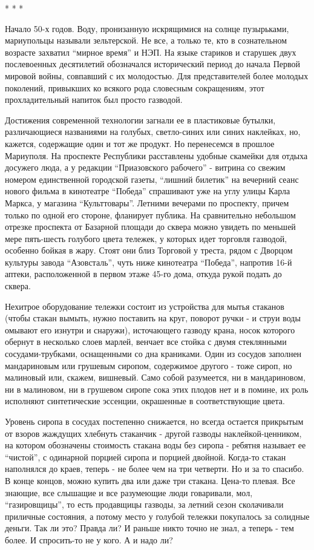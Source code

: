 * * *

Начало 50-х годов. Воду, пронизанную искрящимися на солнце пузырь­ками,
мариупольцы называли зельтерской. Не все, а только те, кто в сознательном
возрасте захватил \enquote{мирное время} и НЭП. На языке стариков и старушек
двух послевоенных десятилетий обозначался исторический период до начала Первой
мировой войны, совпавший с их молодостью. Для пред­ставителей более молодых
поколений, привыкших ко всякого рода словесным сокращениям, этот
прохладительный напиток был просто газводой.

Достижения современной технологии загнали ее в пластиковые бутылки,
различающиеся названиями на голубых, светло-синих или синих наклейках, но,
кажется, содержа­щие один и тот же продукт. Но перенесемся в прошлое
Мариуполя. На проспекте Республики расставлены удобные скамейки для отдыха
досужего люда, а у редакции \enquote{Приазовского рабочего} - витрина со свежим номером
единственной городской газеты, \enquote{лишний билетик} на вечерний сеанс нового
фильма в кинотеатре ­\enquote{Победа} спрашивают уже на углу улицы Карла Маркса, у
магази­на \enquote{Культтовары}. Летними вечерами по проспекту, причем только по одной
его стороне, фланирует публика.  На сравнительно небольшом отрезке проспекта от
Базар­ной площади до сквера можно увидеть по меньшей мере пять-шесть голубого
цвета тележек, у которых идет торговля газводой, особенно бойкая в жару. Стоят
они близ Торговой у треста, рядом с Дворцом культуры завода \enquote{Азовсталь}, чуть
ниже кинотеатра \enquote{Победа}, напротив 16-й аптеки, расположенной в первом этаже
45-го дома, откуда рукой подать до сквера.

Нехитрое оборудование тележки состоит из устройства для мытья стаканов (чтобы
стакан вымыть, нужно поставить на круг, поворот ручки - и струи воды омывают
его изнутри и снаружи), источающего газводу крана, носок которого обернут в
несколько слоев марлей, венчает все стойка с двумя стеклянными
сосудами-трубками, оснащенными со дна краниками. Один из сосудов заполнен
мандариновым или грушевым сиропом, содержимое другого - тоже сироп, но
малиновый или, скажем, вишневый. Само собой разумеется, ни в ман­дариновом, ни
в малиновом, ни в грушевом сиропе сока этих плодов нет и в помине, их роль
исполняют синтетические эссенции, окрашенные в соответствующие цвета.

Уровень сиропа в сосудах постепенно снижается, но все­гда остается прикрытым от
взоров жаждущих хлебнуть стаканчик - другой газводы наклейкой-ценником, на
котором обозначены стоимость стакана воды без сиропа - ребятня называет ее
\enquote{чистой}, с одинарной порцией сиропа и порцией двойной. Когда-то стакан
наполнялся до краев, теперь - не более чем на три четверти. Но и за то спасибо.
В конце концов, можно купить два или даже три стакана. Цена-то плевая.  Все
знающие, все слышащие и все разумеющие люди говаривали, мол, \enquote{газировщицы}, то
есть продавщицы газводы, за летний сезон сколачивали приличные состояния, а
потому место у голубой тележки покупалось за солидные деньги. Так ли это?
Правда ли? И раньше никто точно не знал, а теперь - тем более. И спросить-то не
у кого. А и надо ли?

